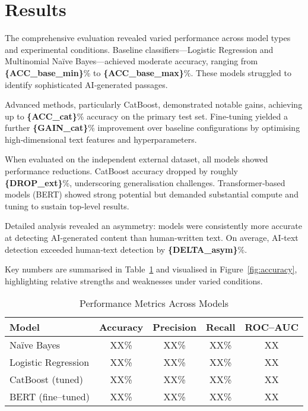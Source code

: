 \section{Results}  %

The comprehensive evaluation revealed varied performance across model
types and experimental conditions. Baseline classifiers---Logistic
Regression and Multinomial Naïve Bayes---achieved moderate accuracy,
ranging from \textbf{\{ACC\_base\_min\}}\% to
\textbf{\{ACC\_base\_max\}}\%. These models struggled to identify
sophisticated AI‐generated passages.

Advanced methods, particularly CatBoost, demonstrated notable gains,
achieving up to \textbf{\{ACC\_cat\}}\% accuracy on the primary test
set. Fine‐tuning yielded a further \textbf{\{GAIN\_cat\}}\% improvement
over baseline configurations by optimising high‐dimensional text
features and hyperparameters.

When evaluated on the independent external dataset, all models showed
performance reductions. CatBoost accuracy dropped by roughly
\textbf{\{DROP\_ext\}}\%, underscoring generalisation challenges.
Transformer‐based models (BERT) showed strong potential but demanded
substantial compute and tuning to sustain top‐level results.

Detailed analysis revealed an asymmetry: models were consistently more
accurate at detecting AI‐generated content than human‐written text. On
average, AI‐text detection exceeded human‐text detection by
\textbf{\{DELTA\_asym\}}\%.

Key numbers are summarised in Table~\ref{tab:results} and visualised in
Figure~\ref{fig:accuracy}, highlighting relative strengths and
weaknesses under varied conditions.

\begin{table}[tb]  %
\caption{Performance Metrics Across Models}%
\label{tab:results}
\centering
\begin{tabular}{|l|c|c|c|c|}
\hline
\textbf{Model} & \textbf{Accuracy} & \textbf{Precision} &
\textbf{Recall} & \textbf{ROC--AUC} \\
\hline
Naïve Bayes            & XX\% & XX\% & XX\% & XX \\ %
Logistic Regression    & XX\% & XX\% & XX\% & XX \\
CatBoost (tuned)       & XX\% & XX\% & XX\% & XX \\
BERT (fine–tuned)      & XX\% & XX\% & XX\% & XX \\
\hline
\end{tabular}
\end{table}

